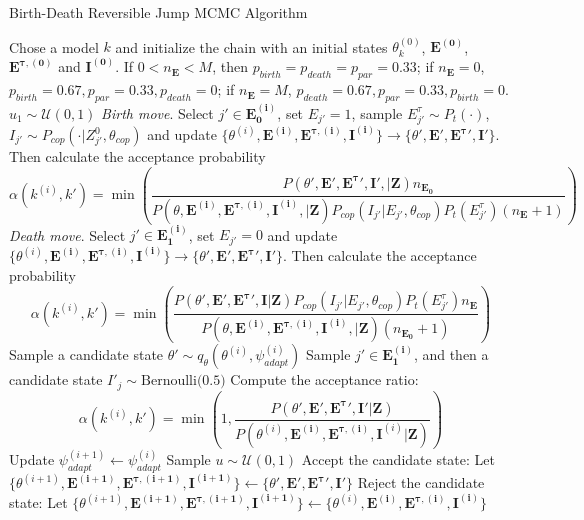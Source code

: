 \begin{algorithm}[H]
\caption{Birth-Death Reversible Jump MCMC Algorithm}
\label{alg:rjmcmc_B}
\begin{algorithmic}[1]
    \State Chose a model $k$ and initialize the chain with an initial states $\theta^{(0)}_{k}$, $\mathbf{E^{(0)}}$, $\mathbf{E^{\tau, (0)}}$ and $\mathbf{I^{(0)}}$. If $0 < n_\mathbf{E} < M$, then $p_{birth} = p_{death} = p_{par} = 0.33$; if $n_\mathbf{E} = 0$, $p_{birth} = 0.67, p_{par} = 0.33, p_{death} = 0$; if $n_\mathbf{E} = M$, $p_{death} = 0.67, p_{par} = 0.33, p_{birth} = 0$.
    	\State $u_1 \sim \mathcal{U}(0, 1)$  
	 	\State \textit{Birth move}. Select $j' \in \mathbf{E^{(i)}_0}$, set $E_{j'} = 1$, sample $E^\tau_{j'} \sim P_t(\cdot)$, $I_{j'}\sim P_{cop}(\cdot | Z_{j'}^0, \theta_{cop})$ and update $\{\theta^{(i)}, \mathbf{E^{(i)}}, \mathbf{E^{\tau, (i)}}, \mathbf{I^{(i)}}\} \rightarrow \{\theta', \mathbf{E}', \mathbf{E^\tau}', \mathbf{I}'\}$. Then calculate the acceptance probability 
		$$\alpha(k^{(i)}, k') = \min\left(\frac{P(\theta', \mathbf{E}', \mathbf{E^\tau}', \mathbf{I}', | \mathbf{Z})n_{\mathbf{E_0}}}{P(\theta, \mathbf{E^{(i)}}, \mathbf{E^{\tau, (i)}}, \mathbf{I^{(i)}}, | \mathbf{Z})P_{cop}(I_{j'} | E_{j'}, \theta_{cop})P_t(E^\tau_{j'})(n_{\mathbf{E}} + 1)} \right)$$
		\State \textit{Death move}. Select $j' \in \mathbf{E^{(i)}_1}$, set $E_{j'} = 0$ and update $\{\theta^{(i)}, \mathbf{E^{(i)}}, \mathbf{E^{\tau, (i)}}, \mathbf{I^{(i)}}\} \rightarrow \{\theta', \mathbf{E}', \mathbf{E^\tau}', \mathbf{I}'\}$. Then calculate the acceptance probability 
$$\alpha(k^{(i)}, k') = \min\left(\frac{P(\theta', \mathbf{E}', \mathbf{E^{\tau}}', \mathbf{I} | \mathbf{Z})P_{cop}(I_{j'} | E_{j'}, \theta_{cop})P_t(E^\tau_{j'})n_{\mathbf{E}}}{P(\theta, \mathbf{E^{(i)}}, \mathbf{E^{\tau, (i)}}, \mathbf{I^{(i)}}, | \mathbf{Z})(n_{\mathbf{E_0}} + 1)} \right)$$
	\Else
 	\State Sample a candidate state $\theta' \sim q_\theta(\theta^{(i)}, \psi^{(i)}_{adapt})$
    	\State Sample  $j' \in \mathbf{E^{(i)}_1}$, and then a candidate state $I'_j \sim \text{Bernoulli(0.5)}$
    	    \State Compute the acceptance ratio:
        		\[
        \alpha(k^{(i)}, k') = \min\left(1, \frac{P(\theta', \mathbf{E}', \mathbf{E^{\tau}}', \mathbf{I}'|\mathbf{Z})}{P(\theta^{(i)}, \mathbf{E^{(i)}}, \mathbf{E^{\tau, (i)}}, \mathbf{I}^{(i)}|\mathbf{Z})} \right)
        			\]
	\State Update $ \psi^{(i + 1)}_{adapt} \leftarrow \psi^{(i)}_{adapt}$
        \EndIf 
		   \State Sample $u \sim \mathcal{U}(0, 1)$
            			\State Accept the candidate state: Let $\{\theta^{(i+1)}, \mathbf{E^{(i+1)}}, \mathbf{E^{\tau, (i+1)}}, \mathbf{I^{(i+1)}}\} \leftarrow \{\theta', \mathbf{E}', \mathbf{E^\tau}', \mathbf{I}'\}$
			\Else
				\State Reject the candidate state: Let $\{\theta^{(i+1)}, \mathbf{E^{(i+1)}}, \mathbf{E^{\tau, (i+1)}}, \mathbf{I^{(i+1)}}\} \leftarrow \{\theta^{(i)}, \mathbf{E^{(i)}}, \mathbf{E^{\tau, (i)}}, \mathbf{I^{(i)}}\}$

			\EndIf        

    \EndFor
\end{algorithmic}
\end{algorithm}

